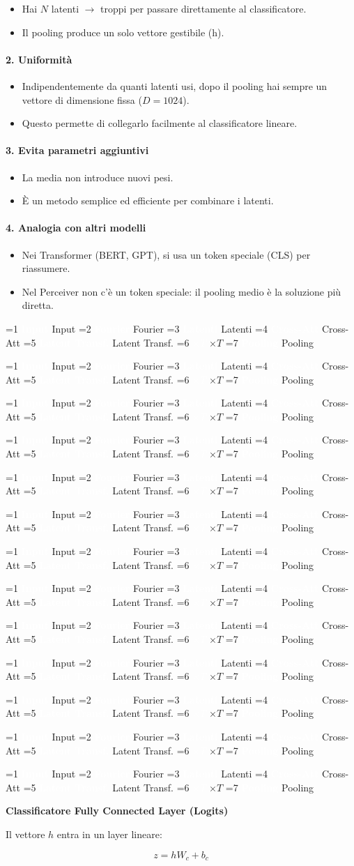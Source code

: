 \documentclass[
  11pt,
]{article}
\newcommand{\pipelinestep}[2]{%
  \ifnum#2=1
    \tikz[baseline=(n.base)]{\node[draw=seccolor, fill=seccolor!15, rounded corners=2pt,
      inner sep=2pt, font=\footnotesize\bfseries] (n) {#1};}%
  \else
    \tikz[baseline=(n.base)]{\node[draw=boxframe, rounded corners=2pt,
      inner sep=2pt, font=\footnotesize] (n) {#1};}%
  \fi
}
\newcommand{\parr}{{\footnotesize\;$\to$\;}}
\newcommand{\pipeline}[1]{%
\begin{tcolorbox}[colback=white, colframe=seccolor!60, boxrule=0.6pt, arc=4pt,
  left=4pt, right=4pt, top=5pt, bottom=5pt, title={\footnotesize\bfseries\color{white} Forward Pass Pipeline}, fonttitle=\footnotesize, coltitle=white, colbacktitle=seccolor!70]
\centering
\pipelinestep{Input}{%
  \ifnum#1=1 1\else 0\fi}%
\parr\pipelinestep{Fourier}{%
  \ifnum#1=2 1\else 0\fi}%
\parr\pipelinestep{Embedding}{%
  \ifnum#1=3 1\else 0\fi}%
\parr\pipelinestep{Latent Array}{%
  \ifnum#1=4 1\else 0\fi}%
\parr\pipelinestep{Cross-Att}{%
  \ifnum#1=5 1\else 0\fi}%
\parr\pipelinestep{Res+MLP}{%
  \ifnum#1=6 1\else 0\fi}%
\\[4pt]
\pipelinestep{Latent Transf.}{%
  \ifnum#1=7 1\else 0\fi}%
\parr\pipelinestep{Res+MLP}{%
  \ifnum#1=8 1\else 0\fi}%
\parr\pipelinestep{$\times T$}{%
  \ifnum#1=9 1\else 0\fi}%
\parr\pipelinestep{Pooling}{%
  \ifnum#1=10 1\else 0\fi}%
\parr\pipelinestep{Classifier}{%
  \ifnum#1=11 1\else 0\fi}%
\parr\pipelinestep{Loss}{%
  \ifnum#1=12 1\else 0\fi}%
\end{tcolorbox}
}
\newcommand{\mystripchip}[3]{%
  \setlength{\fboxsep}{2.8pt}%
  \ifnum#3=#1\relax
    \colorbox{seccolor}{\textcolor{white}{\bfseries #2}}%
  \else
    \colorbox{seccolor!8}{\textcolor{seccolor!55}{#2}}%
  \fi}
\newcommand{\mystriparr}{{\fontsize{8}{8}\selectfont\;\textcolor{seccolor!45}{$\rightarrow$}\;}}
\newcommand{\mystrip}[1]{%
\begin{center}
{\sffamily\fontsize{7.5}{9}\selectfont
\mystripchip{1}{Input}{#1}\mystriparr\mystripchip{2}{Fourier}{#1}\mystriparr\mystripchip{3}{Latenti}{#1}\mystriparr%
\mystripchip{4}{Cross-Att}{#1}\mystriparr\mystripchip{5}{Latent Transf.}{#1}\mystriparr%
\mystripchip{6}{$\times T$}{#1}\mystriparr\mystripchip{7}{Pooling}{#1}}
\end{center}}
\renewcommand{\pipeline}[1]{%
  \ifcase#1\relax
    \mystrip{0}%
    \or\mystrip{1}%
    \or\mystrip{2}%
    \or\mystrip{2}%
    \or\mystrip{3}%
    \or\mystrip{4}%
    \or\mystrip{4}%
    \or\mystrip{5}%
    \or\mystrip{5}%
    \or\mystrip{6}%
    \or\mystrip{7}%
    \or\mystrip{7}%
    \or\mystrip{7}%
  \fi}
\begin{document}
\begin{itemize}
\item
  Hai \(N\) latenti \(\rightarrow\) troppi per passare direttamente al
  classificatore.
\item
  Il pooling produce un solo vettore gestibile (h).
\end{itemize}

\paragraph{2. \textbf{Uniformità}}

\begin{itemize}
\item
  Indipendentemente da quanti latenti usi, dopo il pooling hai sempre un
  vettore di dimensione fissa ($D = 1024$).
\item
  Questo permette di collegarlo facilmente al classificatore lineare.
\end{itemize}

\paragraph{3. \textbf{Evita parametri aggiuntivi}}

\begin{itemize}
\item
  La media non introduce nuovi pesi.
\item
  È un metodo semplice ed efficiente per combinare i latenti.
\end{itemize}

\paragraph{4. \textbf{Analogia con altri modelli}}

\begin{itemize}
\item
  Nei Transformer (BERT, GPT), si usa un token speciale (CLS) per
  riassumere.
\item
  Nel Perceiver non c'è un token speciale: il pooling
  medio è la soluzione più diretta.
\end{itemize}

\pipeline{10}


\textbf{Classificatore Fully Connected Layer (Logits)}

Il vettore \(h\) entra in un layer lineare:

\[z = hW_{c} + b_{c}\]
\end{document}
